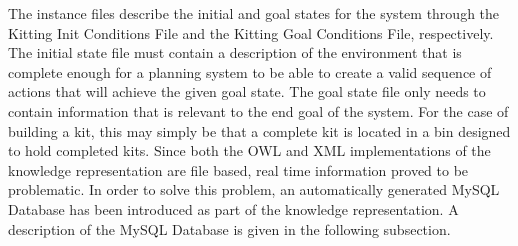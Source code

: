The instance files describe the initial and goal states for the
system through the \textsf{Kitting Init Conditions File} and the
\textsf{Kitting Goal Conditions File}, respectively. The initial state file
must contain a description of the environment that is complete enough for a
planning system to be able to create a valid sequence of actions that will
achieve the given goal state. The goal state file only needs to contain
information that is relevant to the end goal of the system. For the case of building a kit, this may simply be that a complete kit is located in a bin designed to hold completed kits.
% 
% 
% 
% 
% 
Since both the OWL and XML implementations of the knowledge representation are file based, real time information proved to be problematic. In order to solve this problem, an automatically generated \textsf{MySQL Database} \cite{MySQL} has been introduced as part of the knowledge representation. A description of the \textsf{MySQL Database} is given in the following subsection.


